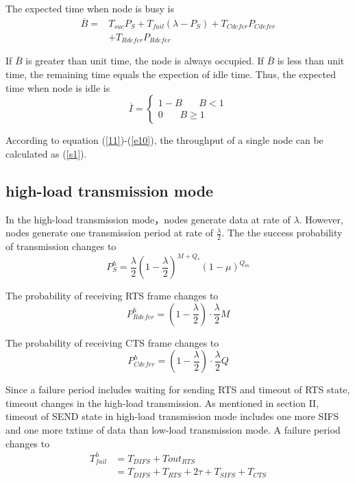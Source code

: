 \documentclass[conference]{IEEEtran}
\begin{document}
The expected time when node is busy is
\begin{equation}
\begin{aligned}
\overline B=&T_{suc}P_S+T_{fail}(\lambda-P_S )+ T_{Cdefer}P_{Cdefer}\\&+T_{Rdefer}P_{Rdefer}
\end{aligned}
\label{e9}
\end{equation}

If $ \overline B $ is greater than unit time, the node is always occupied. If $ \overline B $ is less than unit time, the remaining time equals the expection of idle time. Thus, the expected time when node is idle is
\begin{equation}
\overline I=\left\{
\begin{aligned}
1-B \ \ \ \ \ \ \ \ B<1\\
0\ \ \ \ \ \ \ \    B\ge 1
\end{aligned}
\right.
\label{e10}
\end{equation}

According to equation (\ref{11})-(\ref{e10}), the throughput of a single node can be calculated as (\ref{s1}).


\subsection {high-load transmission mode}
In the high-load transmission mode，nodes generate data at rate of $\lambda$. However, nodes generate one transmission period at rate of $\frac{\lambda}{2}$. The the success probability of transmission changes to
\begin{equation}
P_S^h=\frac{\lambda}{2}(1-\frac{\lambda}{2})^{M+Q_s}(1-\mu)^{Q_m}
\label{h1}
\end{equation}

The probability of receiving RTS frame changes to
\begin{equation}
P_{Rdefer}^h=(1-\frac{\lambda}{2})\cdot\frac{\lambda}{2} M
\end{equation}

The probability of receiving CTS frame changes to
\begin{equation}
P_{Cdefer}^h=(1-\frac{\lambda}{2})\cdot\frac{\lambda}{2} Q
\end{equation}

Since a failure period includes waiting for sending RTS and timeout of RTS state, timeout changes in the high-load transmission. As mentioned in section II, timeout of SEND state in high-load transmission mode includes one more SIFS and one more txtime of data than low-load transmission mode. A failure period changes to
\begin{equation}
\begin{aligned}
T_{fail}^h&=T_{DIFS}+Tout_{RTS}\\
&=T_{DIFS}+T_{RTS}+2\tau+T_{SIFS}+T_{CTS}
\end{aligned}
\end{equation}
\end{document}
